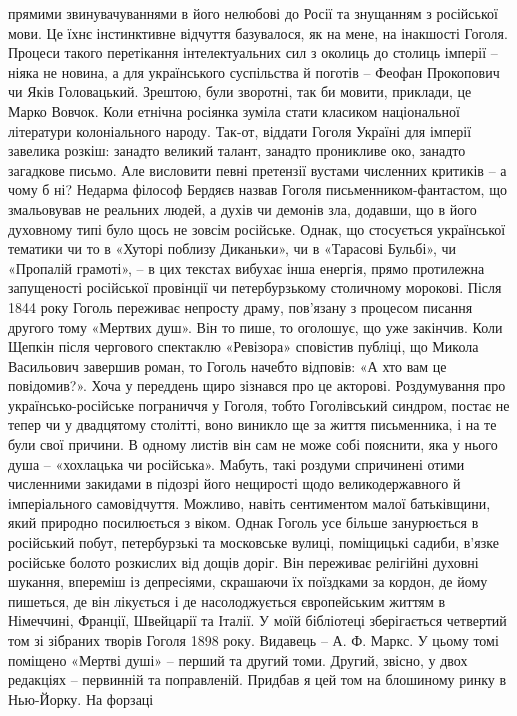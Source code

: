 прямими звинувачуваннями в його нелюбові до Росії та знущанням з російської
мови. Це їхнє інстинктивне відчуття базувалося, як на мене, на інакшості
Гоголя. Процеси такого перетікання інтелектуальних сил з околиць до столиць
імперії – ніяка не новина, а для українського суспільства й поготів – Феофан
Прокопович чи Яків Головацький. Зрештою, були зворотні, так би мовити,
приклади, це Марко Вовчок. Коли етнічна росіянка зуміла стати класиком
національної літератури колоніального народу. Так-от, віддати Гоголя Україні
для імперії завелика розкіш: занадто великий талант, занадто проникливе око,
занадто загадкове письмо. Але висловити певні претензії вустами численних
критиків – а чому б ні? Недарма філософ Бердяєв назвав Гоголя
письменником-фантастом, що змальовував не реальних людей, а духів чи демонів
зла, додавши, що в його духовному типі було щось не зовсім російське. Однак, що
стосується української тематики чи то в «Хуторі поблизу Диканьки», чи в
«Тарасові Бульбі», чи «Пропалій грамоті», – в цих текстах вибухає інша енергія,
прямо протилежна запущеності російської провінції чи петербурзькому столичному
морокові. Після 1844 року Гоголь переживає непросту драму, пов’язану з процесом
писання другого тому «Мертвих душ». Він то пише, то оголошує, що уже закінчив.
Коли Щепкін після чергового спектаклю «Ревізора» сповістив публіці, що Микола
Васильович завершив роман, то Гоголь начебто відповів: «А хто вам це
повідомив?». Хоча у переддень щиро зізнався про це акторові. Роздумування про
українсько-російське пограниччя у Гоголя, тобто Гоголівський синдром, постає не
тепер чи у двадцятому столітті, воно виникло ще за життя письменника, і на те
були свої причини. В одному листів він сам не може собі пояснити, яка у нього
душа – «хохлацька чи російська». Мабуть, такі роздуми спричинені отими
численними закидами в підозрі його нещирості щодо великодержавного й
імперіального самовідчуття. Можливо, навіть сентиментом малої батьківщини, який
природно посилюється з віком. Однак Гоголь усе більше занурюється в російський
побут, петербурзькі та московське вулиці, поміщицькі садиби, в’язке російське
болото розкислих від дощів доріг. Він переживає релігійні духовні шукання,
впереміш із депресіями, скрашаючи їх поїздками за кордон, де йому пишеться, де
він лікується і де насолоджується європейським життям в Німеччині, Франції,
Швейцарії та Італії. У моїй бібліотеці зберігається четвертий том зі зібраних
творів Гоголя 1898 року. Видавець – А. Ф. Маркс. У цьому томі поміщено «Мертві
душі» – перший та другий томи. Другий, звісно, у двох редакціях – первинній та
поправленій. Придбав я цей том на блошиному ринку в Нью-Йорку. На форзаці
